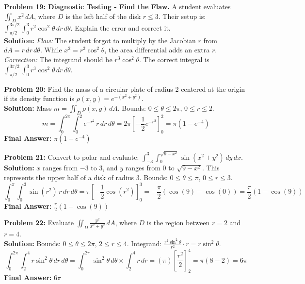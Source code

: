 \documentclass[11pt]{article}
\begin{document}
\vspace{0.5cm}
\textbf{Problem 19: Diagnostic Testing - Find the Flaw.} A student evaluates $\iint_D x^2 \, dA$, where $D$ is the left half of the disk $r \le 3$. Their setup is: $\int_{\pi/2}^{3\pi/2} \int_0^3 r^2 \cos^2\theta \, dr \, d\theta$. Explain the error and correct it.
\\
\textbf{Solution:}
\textit{Flaw:} The student forgot to multiply by the Jacobian $r$ from $dA = r \, dr \, d\theta$. While $x^2 = r^2\cos^2\theta$, the area differential adds an extra $r$.
\textit{Correction:} The integrand should be $r^3 \cos^2\theta$. The correct integral is $\int_{\pi/2}^{3\pi/2} \int_0^3 r^3 \cos^2\theta \, dr \, d\theta$.

\vspace{0.5cm}
\textbf{Problem 20:} Find the mass of a circular plate of radius 2 centered at the origin if its density function is $\rho(x,y) = e^{-(x^2+y^2)}$.
\\
\textbf{Solution:}
Mass $m = \iint_D \rho(x,y) \, dA$. Bounds: $0 \le \theta \le 2\pi$, $0 \le r \le 2$.
$$ m = \int_0^{2\pi} \int_0^2 e^{-r^2} \, r \, dr \, d\theta = 2\pi \left[ -\frac{1}{2} e^{-r^2} \right]_0^2 = \pi(1 - e^{-4}) $$
\textbf{Final Answer:} $\pi(1 - e^{-4})$

\vspace{0.5cm}
\textbf{Problem 21:} Convert to polar and evaluate: $\int_{-3}^3 \int_0^{\sqrt{9-x^2}} \sin(x^2+y^2) \, dy \, dx$.
\\
\textbf{Solution:}
$x$ ranges from $-3$ to $3$, and $y$ ranges from $0$ to $\sqrt{9-x^2}$. This represents the upper half of a disk of radius 3. Bounds: $0 \le \theta \le \pi$, $0 \le r \le 3$.
$$ \int_0^\pi \int_0^3 \sin(r^2) \, r \, dr \, d\theta = \pi \left[ -\frac{1}{2} \cos(r^2) \right]_0^3 = -\frac{\pi}{2} (\cos(9) - \cos(0)) = \frac{\pi}{2}(1 - \cos(9)) $$
\textbf{Final Answer:} $\frac{\pi}{2}(1 - \cos(9))$

\vspace{0.5cm}
\textbf{Problem 22:} Evaluate $\iint_D \frac{y^2}{x^2+y^2} \, dA$, where $D$ is the region between $r=2$ and $r=4$.
\\
\textbf{Solution:}
Bounds: $0 \le \theta \le 2\pi$, $2 \le r \le 4$.
Integrand: $\frac{r^2\sin^2\theta}{r^2} \cdot r = r\sin^2\theta$.
$$ \int_0^{2\pi} \int_2^4 r\sin^2\theta \, dr \, d\theta = \int_0^{2\pi} \sin^2\theta \, d\theta \times \int_2^4 r \, dr = \left( \pi \right) \left[ \frac{r^2}{2} \right]_2^4 = \pi(8 - 2) = 6\pi $$
\textbf{Final Answer:} $6\pi$
\end{document}
